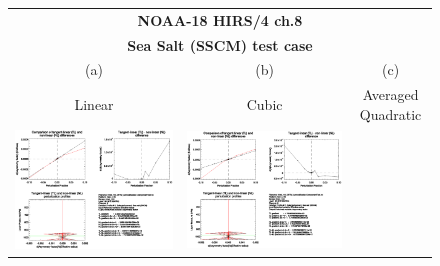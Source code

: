 \begin{figure}[htp]
  \centering
  \begin{tabular}{c c c}
    \multicolumn{3}{c}{\qquad\sffamily\textbf{NOAA-18 HIRS/4 ch.8}}\\
    \multicolumn{3}{c}{\qquad\sffamily\textbf{Sea Salt (SSCM) test case}}\\
    \qquad\textsf{(a)} & \qquad\textsf{(b)}  & \qquad\textsf{(c)} \\
    \qquad\textsf{Linear} & \qquad\textsf{Cubic}  & \qquad\textsf{Averaged Quadratic} \\
    \includegraphics[bb=90 400 300 540,clip,scale=0.7]{graphics/Aerosol/TL/hirs4_n18.ch8.SSCM.NLIN.dg_dReff.eps} &
    \includegraphics[bb=90 400 300 540,clip,scale=0.7]{graphics/Aerosol/TL/hirs4_n18.ch8.SSCM.NCUBIC.dg_dReff.eps} &

\end{tabular}
\end{figure}
